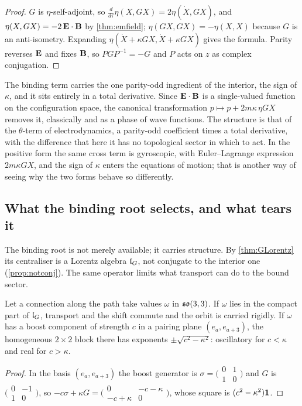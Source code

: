 \begin{proof}
$G$ is $\eta$-self-adjoint, so $\tfrac{d}{d\tau}\eta(X,GX)=2\eta(\dot X,GX)$, and $\eta(X,GX)=-2\,\mathbf E\cdot\mathbf B$ by \cref{thm:emfield}; $\eta(GX,GX)=-\eta(X,X)$
because $G$ is an anti-isometry. Expanding $\eta(\dot X+\kappa GX,\dot X+\kappa GX)$ gives the formula. Parity reverses $\mathbf E$ and fixes $\mathbf B$, so
$PGP^{-1}=-G$ and $P$ acts on $z$ as complex conjugation.
\end{proof}

The binding term carries the one parity-odd ingredient of the interior, the sign of $\kappa$, and it sits entirely in a total derivative.
Since $\mathbf E\cdot\mathbf B$ is a single-valued function on the configuration space, the canonical transformation $p\mapsto p+2m\kappa\,\eta GX$ removes it,
classically and as a phase of wave functions. The structure is that of the $\theta$-term of electrodynamics, a parity-odd coefficient times a
total derivative, with the difference that here it has no topological sector in which to act. In the positive form the same cross term is
gyroscopic, with Euler--Lagrange expression $2m\kappa G\dot X$, and the sign of $\kappa$ enters the equations of motion; that is another way of
seeing why the two forms behave so differently.

\subsection{What the binding root selects, and what tears it}

The binding root is not merely available; it carries structure. By \cref{thm:GLorentz} its centraliser is a Lorentz algebra $\mathfrak l_G$, not
conjugate to the interior one (\cref{prop:notconj}). The same operator limits what transport can do to the bound sector.

\begin{proposition}
\label{prop:tear}
Let a connection along the path take values $\omega$ in $\mathfrak{so}(3,3)$. If $\omega$ lies in the compact part of $\mathfrak l_G$, transport and the shift commute
and the orbit is carried rigidly. If $\omega$ has a boost component of strength $c$ in a pairing plane $(e_a,e_{a+3})$, the homogeneous $2\times2$
block there has exponents $\pm\sqrt{c^2-\kappa^2}$: oscillatory for $c<\kappa$ and real for $c>\kappa$.
\end{proposition}

\begin{proof}
In the basis $(e_a,e_{a+3})$ the boost generator is $\sigma=\bigl(\begin{smallmatrix}0&1\\1&0\end{smallmatrix}\bigr)$ and $G$ is
$\bigl(\begin{smallmatrix}0&-1\\1&0\end{smallmatrix}\bigr)$, so $-c\sigma+\kappa G=\bigl(\begin{smallmatrix}0&-c-\kappa\\-c+\kappa&0\end{smallmatrix}\bigr)$, whose
square is $(c^2-\kappa^2)\mathbf 1$.
\end{proof}

